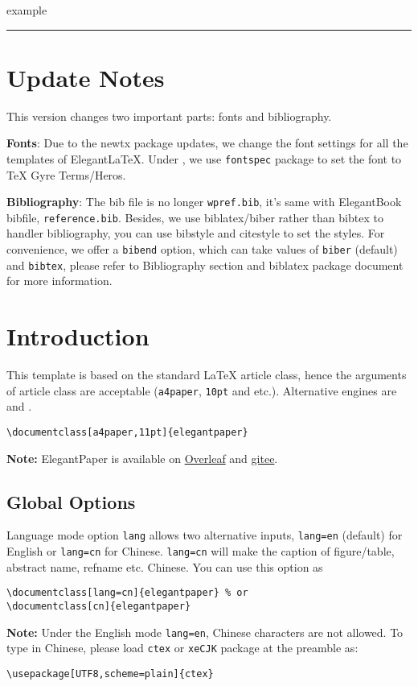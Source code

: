 \documentclass[lang=cn,a4paper,bibend=bibtex]{elegantcs}
\begin{document}
 example

\noindent\rule{\textwidth}{1pt}

\section*{Update Notes}

This version changes two important parts: fonts and bibliography.

\textbf{Fonts}: Due to the newtx package updates, we change the font settings for all the templates of ElegantLaTeX. Under , we use \lstinline{fontspec} package  to set the font to TeX Gyre Terms/Heros.

\textbf{Bibliography}: The bib file is no longer \lstinline{wpref.bib}, it's same with ElegantBook bibfile, \lstinline{reference.bib}. Besides, we use biblatex/biber rather than bibtex to handler bibliography, you can use bibstyle and citestyle to set the styles. For convenience, we offer a \lstinline{bibend} option, which can take values of \lstinline{biber} (default) and \lstinline{bibtex}, please refer to Bibliography section and biblatex package document for more information.

\section{Introduction}

This template is based on the standard \LaTeX{} article class, hence the arguments of article class are acceptable (\lstinline{a4paper}, \lstinline{10pt} and etc.). Alternative engines are  and .

\begin{lstlisting}[style=Latex]
\documentclass[a4paper,11pt]{elegantpaper}
\end{lstlisting}
\textbf{Note:} ElegantPaper is available on  \href{https://www.overleaf.com/latex/templates/elegantpaper-template/yzghrqjhmmmr}{Overleaf} and \href{https://gitee.com/ElegantLaTeX/ElegantPaper}{gitee}.

\subsection{Global Options}
Language mode option \lstinline{lang} allows two alternative inputs, \lstinline{lang=en} (default)  for English or \lstinline{lang=cn} for Chinese. \lstinline{lang=cn} will make the caption of figure/table, abstract name, refname etc. Chinese. You can use this option as
\begin{lstlisting}[style=Latex]
\documentclass[lang=cn]{elegantpaper} % or
\documentclass[cn]{elegantpaper}
\end{lstlisting}
\textbf{Note:} Under the English mode \lstinline{lang=en}, Chinese characters are not allowed. To type in Chinese, please load  \lstinline{ctex} or \lstinline{xeCJK} package at the preamble as:
\begin{lstlisting}[style=Latex]
\usepackage[UTF8,scheme=plain]{ctex}
\end{lstlisting}
\end{document}
